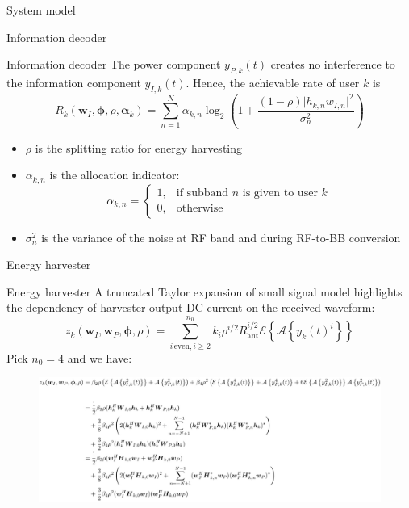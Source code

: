 \documentclass[9pt]{beamer}
\begin{document}
\begin{section}{System model}
	\begin{subsection}{Information decoder}
		\begin{frame}{Information decoder}
			The power component $y_{P,k}(t)$ creates no interference to the information component $y_{I,k}(t)$. Hence, the achievable rate of user $k$ is
			\begin{equation}\label{eq:R_k}
				R_k(\boldsymbol{w}_I,\boldsymbol{\phi},\rho,\boldsymbol{\alpha}_k)=\sum_{n=1}^N\alpha_{k,n}{\log_2\left(1+\frac{(1-\rho)\lvert h_{k,n}w_{I,n} \rvert^2}{\sigma_n^2}\right)}
			\end{equation}
			\begin{itemize}
				\item $\rho$ is the splitting ratio for energy harvesting
				\item $\alpha_{k,n}$ is the allocation indicator:
				\begin{equation}
					\alpha_{k,n} =
					\begin{cases}
						1, & \text{if subband } n \text{ is given to user } k \\
						0, & \text{otherwise}
					\end{cases}
				\end{equation}
				\item $\sigma_n^2$ is the variance of the noise at RF band and during RF-to-BB conversion
			\end{itemize}
		\end{frame}
	\end{subsection}

	\begin{subsection}{Energy harvester}
		\begin{frame}{Energy harvester}
			A truncated Taylor expansion of small signal model highlights the dependency of harvester output DC current on the received waveform:
			\begin{equation}
				z_k(\boldsymbol{w}_I,\boldsymbol{w}_P,\boldsymbol{\phi},\rho)=\sum_{i\,\text{even},i\ge2}^{n_0}{k_i}{\rho^{i/2}}{R_{\text{ant}}^{i/2}}{\mathcal{E}\left\{\mathcal{A}\left\{y_k(t)^i\right\}\right\}}
			\end{equation}
			Pick $n_0=4$ and we have:
			\begin{figure}
				\centering
				\includegraphics[width=\linewidth]{assets/z.eps}
			\end{figure}
		\end{frame}
	\end{subsection}


\end{section}
\end{document}

